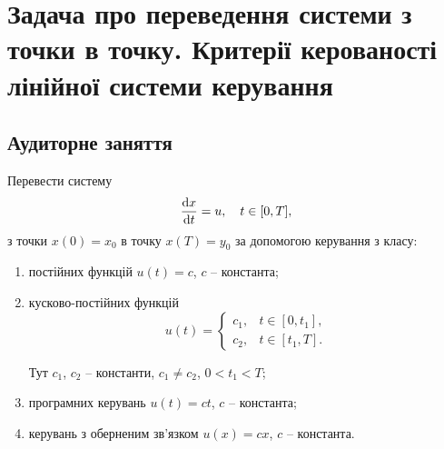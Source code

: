 
\section{Задача про переведення системи з точки в точку. Критерії керованості лінійної системи керування}

\subsection*{Аудиторне заняття}

\begin{problem}
	Перевести систему \[ \frac{\mathop{}\!\mathrm{d} x}{\mathop{}\!\mathrm{d} t} = u, \quad t \in [0, T], \] з точки $x (0) = x_0$ в точку $x (T) = y_0$ за допомогою керування з класу:
	\begin{enumerate}
		\item постійних функцій $u (t) = c$, $c$ -- константа;

		\item кусково-постійних функцій \[ u (t) = \begin{cases} c_1, & t \in [0, t_1], \\ c_2, & t \in [t_1, T]. \end{cases} \]

		Тут $c_1$, $c_2$ -- константи, $c_1 \ne c_2$, $0 < t_1 < T$;

		\item програмних керувань $u(t) = c t$, $c$ -- константа;

		\item керувань з оберненим зв'язком $u(x) = c x$, $c$ -- константа.
	\end{enumerate}
\end{problem}

